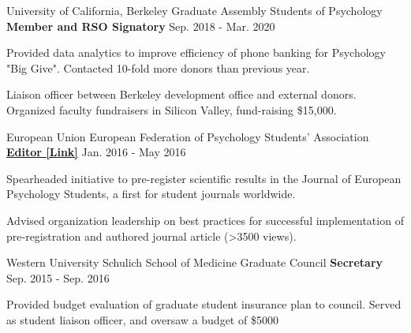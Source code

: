 

\begin{cventries}

  \cventry 
    {University of California, Berkeley} %
    {Graduate Assembly Students of Psychology}
    {\textbf{Member and RSO Signatory}} %
    {Sep. 2018 - Mar. 2020} %
    {
      \begin{cvitems} %
        \item {Provided data analytics to improve efficiency of phone banking for Psychology "Big Give". Contacted 10-fold more donors than previous year.}
        \item {Liaison officer between Berkeley development office and external donors. Organized faculty fundraisers in Silicon Valley, fund-raising \$15,000.}
      \end{cvitems}
    }
    
  \cventry
    {European Union}
    {European Federation of Psychology Students' Association} %
    {\href{https://jeps.efpsa.org/articles/10.5334/jeps.401/}{\textbf{Editor [Link]}}} %
    {Jan. 2016 - May 2016} %
    {
      \begin{cvitems} %
        \item {Spearheaded initiative to pre-register scientific results in the Journal of European Psychology Students, a first for student journals worldwide.}
        \item {Advised organization leadership on best practices for successful implementation of pre-registration and authored journal article (>3500 views).}
      \end{cvitems}
    }
    
  \cventry
  	{Western University} %
  	{Schulich School of Medicine Graduate Council} %
    {\textbf{Secretary}} %
    {Sep. 2015 - Sep. 2016} %
    {
      \begin{cvitems} %
        \item {Provided budget evaluation of graduate student insurance plan to council. Served as student liaison officer, and oversaw a budget of \$5000}
      \end{cvitems}
    }
    

\end{cventries}
